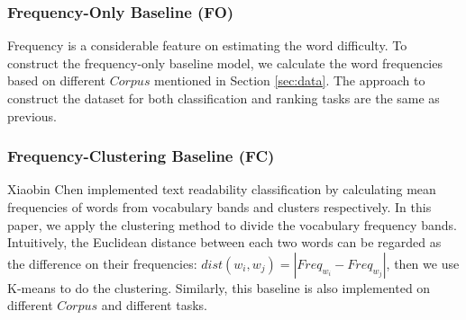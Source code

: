 \subsubsection{Frequency-Only Baseline (FO)}
Frequency is a considerable feature on estimating the word difficulty.
To construct the frequency-only baseline model, 
we calculate the word frequencies 
based on different $Corpus$ mentioned in Section \ref{sec:data}.
The approach to construct the dataset for both classification and ranking tasks are the same as previous. 


\subsubsection{Frequency-Clustering Baseline (FC)}
Xiaobin Chen  implemented text readability classification by calculating mean frequencies of words from vocabulary bands and clusters respectively.
In this paper, we apply the clustering method to divide the vocabulary frequency bands.
Intuitively, the Euclidean distance between each two words can be regarded as the difference on their frequencies:
$dist(w_i, w_j)=|Freq_{w_i}-Freq_{w_j}|$, then
we use K-means to do the clustering.
Similarly, this baseline is also implemented on different $Corpus$ and different tasks.

